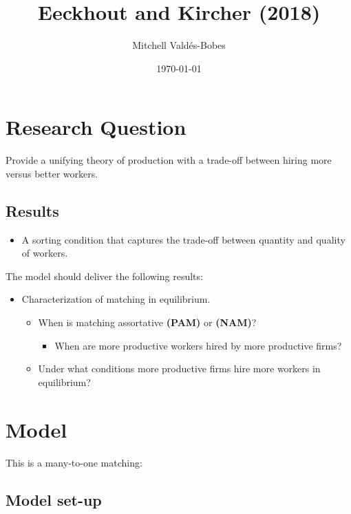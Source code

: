 \documentclass[12pt]{article}
\title{Eeckhout and Kircher (2018)}
\author{Mitchell Valdés-Bobes}
\date{\today}
\theoremstyle{definition}
\begin{document}
\maketitle

\section{Research Question}
Provide a unifying theory of production with a trade-off between hiring more versus better workers.

\subsection{Results}
\begin{itemize}
    \item  A sorting condition that captures the trade-off between quantity and quality of workers. 
\end{itemize}

The model should deliver the following results:
\begin{itemize}
    \item Characterization of matching in equilibrium.
    \begin{itemize}
        \item When is matching assortative \textbf{(PAM)} or \textbf{(NAM)}?
        \begin{itemize}
            \item When are more productive workers hired by more productive firms?
        \end{itemize}
        \item Under what conditions more productive firms hire more workers in equilibrium?
    \end{itemize}
\end{itemize}

\section{Model}
This is a many-to-one matching:

\subsection{Model set-up}
\end{document}
